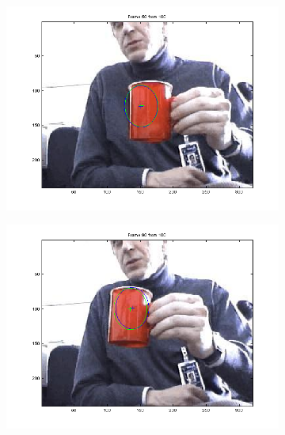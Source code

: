 \documentclass[hyperref={pdfpagelabels=false}]{beamer}
\begin{document}
\begin{frame}
\begin{figure}
\begin{subfigure}[b]{0.3\textwidth}
                 \includegraphics[width=\textwidth]{results/redcup/Frame0050.png}
         \end{subfigure}
         \begin{subfigure}[b]{0.3\textwidth}
                 \includegraphics[width=\textwidth]{results/redcup/Frame0090.png}
         \end{subfigure}
\end{figure}         

\end{frame}
\end{document}
